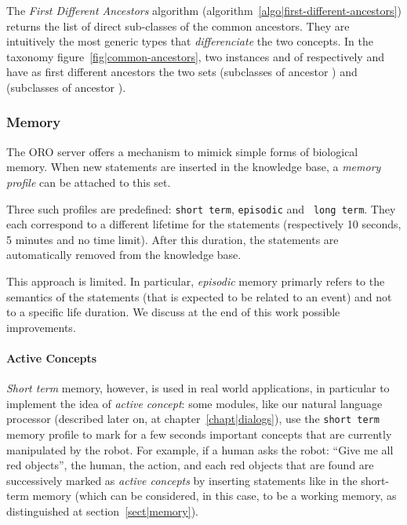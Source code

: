 The \emph{First Different Ancestors} algorithm
(algorithm~\ref{algo|first-different-ancestors}) returns the list of direct
sub-classes of the common ancestors. They are intuitively the most generic
types that \emph{differenciate} the two concepts. In the taxonomy
figure~\ref{fig|common-ancestors}, two instances  and  of
respectively  and  have as first different
ancestors the two sets  (subclasses of ancestor
) and  (subclasses of
ancestor ).


\subsubsection{Memory}
\label{sect|oroserver-memory}

The ORO server offers a mechanism to mimick simple forms of biological memory.
When new statements are inserted in the knowledge base, a \emph{memory profile}
can be attached to this set.

Three such profiles are predefined: {\tt short term}, {\tt episodic} and {\tt
long term}. They each correspond to a different lifetime for the statements
(respectively 10 seconds, 5 minutes and no time limit). After this duration,
the statements are automatically removed from the knowledge base.

This approach is limited. In particular, \emph{episodic} memory primarly refers
to the semantics of the statements (that is expected to be related to an event)
and not to a specific life duration. We discuss at the end of this work possible
improvements.

\paragraph{Active Concepts} \emph{Short term} memory, however, is used in real
world applications, in particular to implement the idea of \emph{active
concept}: some modules, like our natural language processor (described later
on, at chapter~\ref{chapt|dialogs}), use the {\tt short term} memory profile to
mark for a few seconds important concepts that are currently manipulated by the
robot. For example, if a human asks the robot: ``Give me all red objects'', the
human, the  action, and each red objects that are found are
successively marked as \emph{active concepts} by inserting statements like
 in the short-term memory (which can be
considered, in this case, to be a working memory, as distinguished at
section~\ref{sect|memory}).


